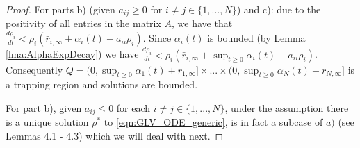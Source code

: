 \documentclass{article}
\begin{document}
\begin{proof}
    For parts b) (given $a_{ij}\geq{0}$ for $i\neq{j
}\in\{1,...,N\}$) and c): due to the positivity of all entries in the matrix $A$, we have that  $\frac{d\rho_i}{dt}<\rho_i(\bar{r}_{i,\infty}+\alpha_i(t)-a_{ii}\rho_i)$. Since $\alpha_{i}(t)$ is bounded (by Lemma \ref{lma:AlphaExpDecay}) we have $\frac{d\rho_i}{dt}<\rho_i(\bar{r}_{i,\infty}+\sup_{t\geq{0}}\alpha_i(t)-a_{ii}\rho_i)$. Consequently $Q=(0,\sup_{t\geq{0}}\alpha_1(t)+r_{1,\infty}]\times...\times(0,\sup_{t\geq{0}}\alpha_N(t)+r_{N,\infty}]$ is a trapping region and solutions are bounded. 

For part b), given $a_{ij}\leq{0}$ for each $i\neq{j}\in\{1,...,N\}$, under the assumption there is a unique solution $\rho^{*}$ to \eqref{eqn:GLV_ODE_generic}, is in fact a subcase of $a)$  (see \cite{pouchol2018global} Lemmas 4.1 - 4.3) which we will deal with next.
 
 




\end{proof}
\end{document}
